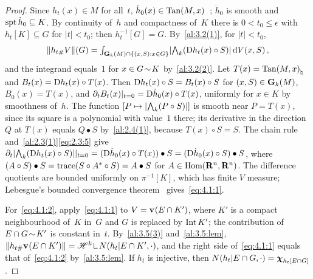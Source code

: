 \begin{proof}
    Since $h_t(x) \in M$ for all~$t$, $\dot h_0(x) \in \operatorname{Tan}(M,x)$~\cite[3.1.21]{Federer1969};
    $\dot h_0$ is smooth and $\operatorname{spt} \dot h_0 \subseteq K$. By continuity of~$h$ and compactness
    of~$K$ there is $0 < t_0 \le \epsilon$ with $h_t[K] \subseteq G$ for $|t| < t_0$; then
    $h_t^{-1}[G] = G$. By~\ref{al:3.2(1)}, for $|t| < t_0$,
    \begin{displaymath}
        \|h_{t \#} V\|(G) = {\textstyle\int_{\mathbf{G}_{k}(M) \cap \{ (x,S) : x \in G \}}^{}} |{\textstyle\boldsymbol{\bigwedge}}_{{k}}(\mathrm{D}
        h_t(x) \circ S)| \,\mathrm{d} V(x,S) \,,
    \end{displaymath}
    and the integrand equals~$1$ for $x \in G \!\sim\! K$ by~\ref{al:3.2(2)}. Let $T(x) =
    {\operatorname{Tan}(M,x)}_\natural$ and $B_t(x) = \mathrm{D} h_t(x) \circ T(x)$. Then $\mathrm{D} h_t(x) \circ S = B_t(x)
    \circ S$ for $(x,S) \in \mathbf{G}_{k}(M)$, $B_0(x) = T(x)$, and $\partial_t B_t(x) |_{t=0} = \mathrm{D} \dot
    h_0(x) \circ T(x)$, uniformly for $x \in K$ by smoothness of~$h$. The function $[P \mapsto
    |{\textstyle\boldsymbol{\bigwedge}}_{{k}}(P \circ S)|]$ is smooth near $P = T(x)$, since its square is a polynomial
    with value~$1$ there; its derivative in the direction~$Q$ at $T(x)$ equals $Q \bullet S$
    by~\ref{al:2.4(1)}, because $T(x) \circ S = S$. The chain rule and~\ref{al:2.3(1)}\eqref{eq:2.3:5}
    give $\partial_t |{\textstyle\boldsymbol{\bigwedge}}_{{k}}(\mathrm{D} h_t(x) \circ S)| |_{t=0} = (\mathrm{D} \dot h_0(x) \circ T(x))
    \bullet S = (\mathrm{D} \dot h_0(x) \circ S) \bullet S$, where $(A \circ S) \bullet S = \operatorname{trace}(S
    \circ A^{*} \circ S) = A \bullet S$ for $A \in \operatorname{Hom}(\mathbf{R}^{n},\mathbf{R}^{n})$. The
    difference quotients are bounded uniformly on $\pi^{-1}[K]$, which has finite $V$ measure;
    Lebesgue's bounded convergence theorem~\cite[2.4.9]{Federer1969} gives~\eqref{eq:4.1:1}.

    For~\eqref{eq:4.1:2}, apply~\eqref{eq:4.1:1} to $V = \mathbf{v}_{}(E \cap K')$, where $K'$ is
    a compact neighbourhood of~$K$ in~$G$ and $G$ is replaced by $\operatorname{Int} K'$; the contribution of
    $E \cap G \!\sim\! K'$ is constant in~$t$. By~\ref{al:3.5(3)} and~\ref{al:3.5:lem}, $\|h_{t
    \#} \var{}(E \cap K')\| = \HM^{\vdim} \restrict N(h_t | E \cap K', \cdot)$, and the right
    side of~\eqref{eq:4.1:1} equals that of~\eqref{eq:4.1:2} by~\ref{al:3.5:lem}. If $h_t$ is
    injective, then $N(h_t | E \cap G, \cdot) = \boldsymbol{\chi}_{h_t[E \cap G]}$.
\end{proof}

